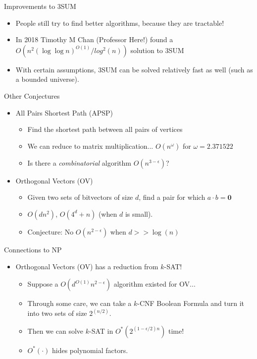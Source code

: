 \documentclass[aspectratio=169]{beamer}
\begin{document}
\begin{frame}{Improvements to 3SUM}
    \begin{itemize}
        \item People still try to find better algorithms, because they are tractable! \pause
        \item In 2018 Timothy M Chan (Professor Here!) found a $O(n^2 (\log \log n)^{O(1)} / log^2(n))$ solution to 3SUM
        \item With certain assumptions, 3SUM can be solved relatively fast as well (such as a bounded universe).
    \end{itemize}
\end{frame}

\begin{frame}{Other Conjectures}
    \begin{itemize}
        \item All Pairs Shortest Path (APSP)
        \begin{itemize}
            \item Find the shortest path between all pairs of vertices \pause 
            \item We can reduce to matrix multiplication... $O(n^{\omega})$ for $\omega = 2.371522$ \pause
            \item Is there a \textit{combinatorial} algorithm $O(n^{3-\epsilon})$?
        \end{itemize}
        \item Orthogonal Vectors (OV)
        \begin{itemize}
            \item Given two sets of bitvectors of size $d$, find a pair for which $a \cdot b = \mathbf{0}$
            \item $O(dn^2)$, $O(4^d + n)$ (when $d$ is small). \pause 
            \item Conjecture: No $O(n^{2- \epsilon})$ when $d >> \log(n)$
        \end{itemize}
    \end{itemize}
\end{frame}

\begin{frame}{Connections to NP}
    \begin{itemize}
        \item Orthogonal Vectors (OV) has a reduction from $k$-SAT! \pause 
        \begin{itemize}
            \item Suppose a $O(d^{O(1)}n^{2 - \epsilon})$ algorithm existed for OV... \pause 
            \item Through some care, we can take a $k$-CNF Boolean Formula and turn it into two sets of size $2^{(n/2)}$. \pause
            \item Then we can solve $k$-SAT in $O^*(2^{(1-\epsilon/2)n})$ time! \pause 
            \item $O^*( \cdot )$ hides polynomial factors.
        \end{itemize}
    \end{itemize}
\end{frame}
\end{document}
